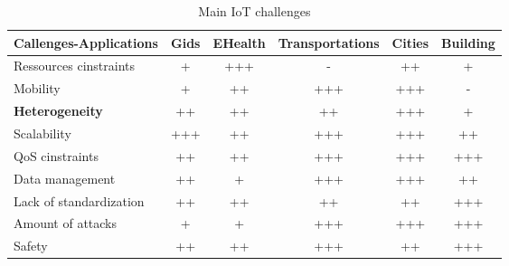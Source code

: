 \begin{table}[h!]
\scriptsize
	\begin{tabulary}{\textwidth}{L|C|C|C|C|C}
	Callenges-Applications  & Gids & EHealth & Transportations & Cities & \textbf{Building}\\\hline
	Ressources cinstraints  & +           & +++     & -               & ++           & +            \\\hline
	Mobility                & +           & ++      & +++             & +++          & -            \\\hline
	\textbf{Heterogeneity}  & ++          & ++      & ++              & +++          & +            \\\hline
	Scalability             & +++         & ++      & +++             & +++          & ++           \\\hline
	QoS cinstraints         & ++          & ++      & +++             & +++          & +++          \\\hline
	Data management         & ++          & +       & +++             & +++          & ++           \\\hline
	Lack of standardization & ++          & ++      & ++              & ++           & +++          \\\hline
	Amount of attacks       & +           & +       & +++             & +++          & +++          \\\hline
	Safety                  & ++          & ++      & +++             & ++           & +++          \\\hline
	\end{tabulary}
\caption{\label{tab:iot_challenges} Main IoT challenges\cite{kouicem_internet_2018}}
\end{table}


